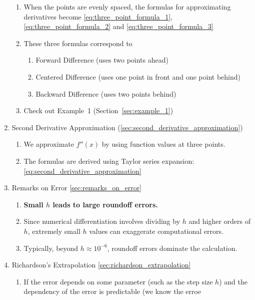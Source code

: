 \documentclass[12pt]{article}
\begin{document}
\begin{enumerate}
    \begin{enumerate}[label=(\alph*)]
      \item When the points are evenly spaced, the formulas for approximating
        derivatives become \eqref{eq:three_point_formula_1}, \eqref{eq:three_point_formula_2}
        and \eqref{eq:three_point_formula_3}
      \item These three formulas correspond to 
        \begin{enumerate}
          \item Forward Difference (uses two points ahead)
          \item Centered Difference (uses one point in front and one point behind)
          \item Backward Difference (uses two points behind)
        \end{enumerate}
      \item Check out Example~1 (Section~\ref{sec:example_1})
    \end{enumerate}
  \item Second Derivative Approximation (\ref{sec:second_derivative_approximation})
    \begin{enumerate}[label=(\alph*)]
      \item We approximate $f''(x)$ by using function values at three points.
      \item The formulas are derived using Taylor series expansion: \eqref{eq:second_derivative_approximation}
    \end{enumerate}
  \item Remarks on Error \ref{sec:remarks_on_error}
    \begin{enumerate}[label=(\alph*)]
      \item \textbf{Small $h$ leads to large roundoff errors.}
      \item Since numerical differentiation involves dividing by $h$ and higher
        orders of $h$, extremely small $h$ values can exaggerate computational
        errors.
      \item Typically, beyond $h\approx 10^{-6}$, roundoff errors dominate the
        calculation.
    \end{enumerate}
  \item Richardson's Extrapolation \ref{sec:richardson_extrapolation}
    \begin{enumerate}[label=(\alph*)]
      \item If the error depends on some parameter (such as the step size $h$)
        and the dependency of the error is predictable (we know the erroe

\end{enumerate}
\end{enumerate}
\end{document}
